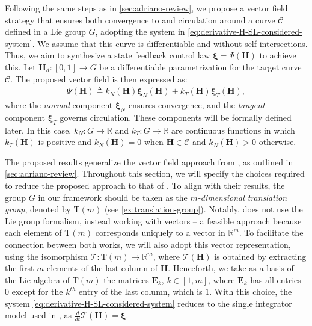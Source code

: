 Following the same steps as in \cref{sec:adriano-review}, we propose a vector field strategy that ensures both convergence to and circulation around a curve $\mathcal{C}$ defined in a Lie group $G$, adopting the system in \eqref{eq:derivative-H-SL-considered-system}. We assume that this curve is differentiable and without self-intersections. Thus, we aim to synthesize a state feedback control law $\boldsymbol{\xi}=\Psi\left(\mathbf{H}\right)$ to achieve this. Let $\mathbf{H}_d:[0,1] \to G$ be a differentiable parametrization for the target curve $\mathcal{C}$. The proposed vector field is then expressed as:
\begin{align}
    \Psi\left(\mathbf{H}\right) \triangleq k_N(\mathbf{H})\boldsymbol{\xi}_N(\mathbf{H}) + k_T(\mathbf{H})\boldsymbol{\xi}_T(\mathbf{H}), \label{eq:vector-field-proposition}
\end{align}
where the \emph{normal} component $\boldsymbol{\xi}_N$ ensures convergence, and the \emph{tangent} component $\boldsymbol{\xi}_T$ governs circulation. These components will be formally defined later. In this case, $k_N: G \to \mathbb{R}$ and $k_T: G \to \mathbb{R}$ are continuous functions in which $k_T(\mathbf{H})$ is positive and $k_N(\mathbf{H})=0$ when $\mathbf{H} \in \mathcal{C}$ and $k_N(\mathbf{H}) > 0$ otherwise. 
\begin{remark}
    The proposed results generalize the vector field approach from \citet{Rezende2022}, as outlined in \cref{sec:adriano-review}. Throughout this section, we will specify the choices required to reduce the proposed approach to that of \citet{Rezende2022}. To align with their results, the group $G$ in our framework should be taken as the \emph{$m$-dimensional translation group}, denoted by $\text{T}(m)$ (see \cref{ex:translation-group}). Notably, \citet{Rezende2022}  does not use the Lie group formalism, instead working with vectors -- a feasible approach because each element of $\text{T}(m)$ corresponds uniquely to a vector in $\mathbb{R}^m$. To facilitate the connection between both works, we will also adopt this vector representation, using the isomorphism $\mathcal{T}: \text{T}(m) \to \mathbb{R}^m$, where $\mathcal{T}(\mathbf{H})$ is obtained by extracting the first $m$ elements of the last column of $\mathbf{H}$. Henceforth, we take as a basis of the Lie algebra of $\text{T}(m)$ the matrices $\mathbf{E}_k$, $k \in [1,m]$, where $\mathbf{E}_k$ has all entries $0$ except for the $k^{th}$ entry of the last column, which is $1$. With this choice, the system \eqref{eq:derivative-H-SL-considered-system} reduces to the single integrator model used in \citet{Rezende2022}, as $\frac{d}{dt} \mathcal{T}(\mathbf{H}) = \boldsymbol{\xi}$.  
\end{remark}

